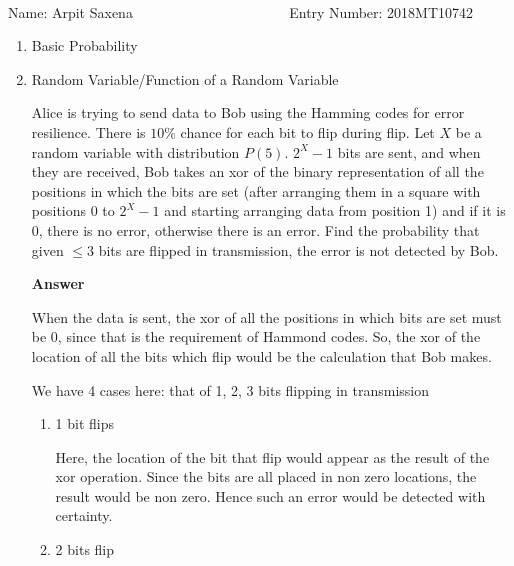\documentclass[12pt, oneside]{article}
\begin{document}
\setlength{\textheight}{8.5in}
\\





\vskip 0.5cm

\noindent Name: Arpit Saxena ~~~~~~~~~~~~~~~~~~~~~ Entry Number: 2018MT10742



\vskip 0.5cm



\begin{enumerate}
	




\item Basic Probability

\item {
    Random Variable/Function of a Random Variable

    Alice is trying to send data to Bob using the Hamming codes for error resilience.
    There is \(10\%\) chance for each bit to flip during flip. Let \(X\) be a random
    variable with distribution \(P(5)\). \(2^X - 1\) bits are sent, and when they
    are received, Bob takes an xor of the binary representation of all the positions in
    which the bits are set (after arranging them in a square with positions 0 to \(2^X - 1\)
    and starting arranging data from position 1) and if it is 0, there is no error, 
    otherwise there is an error.
    Find the probability that given \(\leq 3\) bits are flipped in transmission, the error
    is not detected by Bob.

    \textbf{Answer}

    When the data is sent, the xor of all the positions in which bits are set must be
    0, since that is the requirement of Hammond codes. So, the xor of the location of all the
    bits which flip would be the calculation that Bob makes.

    We have 4 cases here: that of 1, 2, 3 bits flipping in transmission
    \begin{enumerate}
        \item {
            1 bit flips

            Here, the location of the bit that flip would appear as the result of the xor
            operation. Since the bits are all placed in non zero locations, the result
            would be non zero. Hence such an error would be detected with certainty.
        }
        \item {
            2 bits flip

}
\end{enumerate}}
\end{enumerate}
\end{document}
